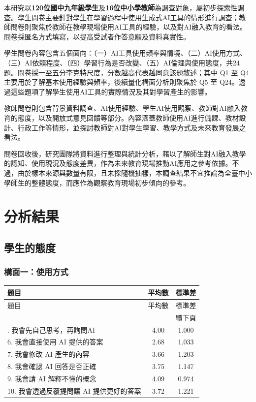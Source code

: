 本研究以\textbf{120位國中九年級學生}及\textbf{16位中小學教師}為調查對象，屬初步探索性調查。學生問卷主要針對學生在學習過程中使用生成式AI工具的情形進行調查；教師問卷則聚焦於教師在教學現場使用AI工具的經驗，以及對AI融入教育的看法。問卷採匿名方式填寫，以提高受試者作答意願及資料真實性。

學生問卷內容包含五個面向：（一）AI工具使用頻率與情境、（二）AI使用方式、（三）AI依賴程度、（四）學習行為是否改變、（五）AI倫理與使用態度，共24題。問卷採一至五分李克特尺度，分數越高代表越同意該題敘述；其中 Q1 至 Q4 主要用於了解基本使用經驗與頻率，後續量化構面分析則聚焦於 Q5 至 Q24。透過這些題項了解學生使用AI工具的實際情況及其對學習產生的影響。

教師問卷則包含背景資料調查、AI使用經驗、學生AI使用觀察、教師對AI融入教育的態度，以及開放式意見回饋等部分。內容涵蓋教師使用AI進行備課、教材設計、行政工作等情形，並探討教師對AI對學生學習、教學方式及未來教育發展之看法。

問卷回收後，研究團隊將資料進行整理與統計分析，藉以了解師生對AI融入教學的認知、使用現況及態度差異，作為未來教育現場推動AI應用之參考依據。不過，由於樣本來源與數量有限，且未採隨機抽樣，本調查結果不宜推論為全臺中小學師生的整體態度，而應作為觀察教育現場初步傾向的參考。

\section{分析結果}\label{sec:分析結果}

\subsection{學生的態度}\label{sec:學生態度}

\subsubsection{構面一：使用方式}\label{sec:構面一}

\begin{longtable}{l c c}
\toprule
題目 & 平均數 & 標準差 \\
\midrule
\endfirsthead
\toprule
題目 & 平均數 & 標準差 \\
\midrule
\endhead
\midrule
\multicolumn{3}{r}{續下頁} \\
\endfoot
\bottomrule
\endlastfoot
5. 我會先自己思考，再詢問AI & 4.00 & 1.000 \\
6. 我會直接使用 AI 提供的答案 & 2.68 & 1.033 \\
7. 我會修改 AI 產生的內容 & 3.66 & 1.203 \\
8. 我會確認 AI 回答是否正確 & 3.75 & 1.147 \\
9. 我會請 AI 解釋不懂的概念 & 4.09 & 0.974 \\
10. 我會透過反覆提問讓 AI 提供更好的答案 & 3.72 & 1.221 \\
\end{longtable}

